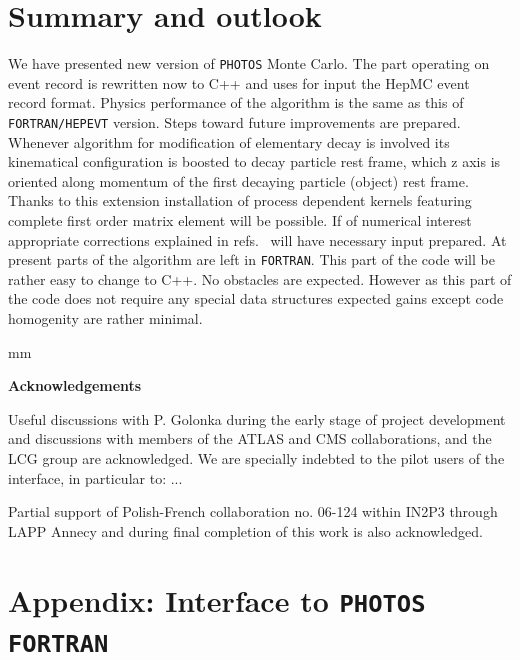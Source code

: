 \documentclass[]{Photos_interface_design}
\begin{document}
\section{Summary and outlook}
We have presented new version  of {\tt PHOTOS} Monte Carlo. The part operating on 
event record is rewritten now to C++ and uses for input the HepMC event record 
format. Physics performance of the algorithm is the same  as this of 
{\tt FORTRAN/HEPEVT} version. Steps toward future improvements are prepared. 
Whenever algorithm for modification of elementary decay is involved its 
kinematical configuration is boosted to decay particle rest frame, which 
z axis is oriented along momentum of the first decaying particle (object) 
rest frame. Thanks to this extension  installation of process dependent 
kernels featuring complete first order matrix element will be possible.
If of numerical interest appropriate corrections explained in 
refs.~\cite{Golonka:2006tw,Nanava:2006vv,Nanava:2009vg}  will have necessary input prepared.
At present parts of the algorithm are left in {\tt FORTRAN}. This part of the code 
will be rather easy to change to C++. No obstacles are expected. However as this part of the code does not require any special data structures expected gains
except code homogenity are rather minimal.  

 mm

\centerline{\large\bf Acknowledgements}


Useful discussions with P. Golonka during the early stage of project development and discussions 
with members of the ATLAS and CMS collaborations, and the LCG group are acknowledged.
We are specially indebted to the pilot users of the interface, in particular to:
...

Partial support of Polish-French collaboration
no. 06-124 within IN2P3 through LAPP Annecy and 
during final completion of this work is
also acknowledged.

\newpage

{}







\newpage
\appendix

\section{Appendix: Interface to {\tt PHOTOS FORTRAN}}
\label{Interface to PHOTOS}
\end{document}
